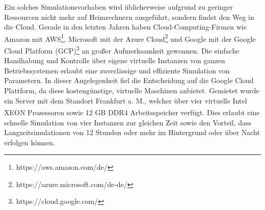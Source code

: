 	Ein solches Simulationsvorhaben wird üblicherweise aufgrund zu geringer Ressourcen nicht mehr auf Heimrechnern ausgeführt, sondern findet den Weg in die Cloud. Gerade in den letzten Jahren haben Cloud-Computing-Firmen wie Amazon mit AWS\footnote{https://aws.amazon.com/de/}, Microsoft mit der Azure Cloud\footnote{https://azure.microsoft.com/de-de/} und Google mit der Google Cloud Platform (GCP)\footnote{https://cloud.google.com/} an großer Aufmerksamkeit gewonnen. Die einfache Handhabung und Kontrolle über eigene virtuelle Instanzen von ganzen Betriebssystemen erlaubt eine zuverlässige und effiziente Simulation von Parametern. In dieser Angelegenheit fiel die Entscheidung auf die Google Cloud Plattform, da diese kostengünstige, virtuelle Maschinen anbietet. Gemietet wurde ein Server mit dem Standort Frankfurt a. M., welcher über vier virtuelle Intel XEON\textsuperscript{\textregistered} Prozessoren sowie 12 GB DDR4 Arbeitsspeicher verfügt. Dies erlaubt eine schnelle Simulation von vier Instanzen zur gleichen Zeit sowie den Vorteil, dass Langzeitsimulationen von 12 Stunden oder mehr im Hintergrund oder über Nacht erfolgen können.
	
